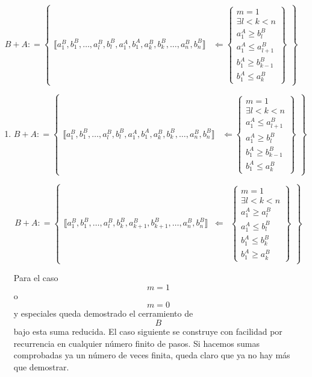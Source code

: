 \documentclass[
]{article}
\begin{document}
\[{{B + A}{: =}}\begin{Bmatrix}
{⟦{{a_{1}^{B},b_{1}^{B}},\ldots,{a_{l}^{B},b_{l}^{B}},{a_{1}^{A},b_{1}^{A}},{a_{k}^{B},b_{k}^{B}},\ldots,{a_{n}^{B},b_{n}^{B}}}⟧} & {\Leftarrow\begin{Bmatrix}
{m = 1} \\
{\exists{{l < k} < n}} \\
{a_{1}^{A} \geq b_{l}^{B}} \\
{a_{1}^{A} \leq a_{l + 1}^{B}} \\
{b_{1}^{A} \geq b_{k - 1}^{B}} \\
{b_{1}^{A} \leq a_{k}^{B}}
\end{Bmatrix}}
\end{Bmatrix}\]

\begin{enumerate}
\def\labelenumi{\arabic{enumi}.}
\setcounter{enumi}{4}
\item
  \[{{B + A}{: =}}\begin{Bmatrix}
  {⟦{{a_{1}^{B},b_{1}^{B}},\ldots,{a_{l}^{B},b_{l}^{B}},{a_{1}^{A},b_{1}^{A}},{a_{k}^{B},b_{k}^{B}},\ldots,{a_{n}^{B},b_{n}^{B}}}⟧} & {\Leftarrow\begin{Bmatrix}
  {m = 1} \\
  {\exists{{l < k} < n}} \\
  {a_{1}^{A} \leq a_{l + 1}^{B}} \\
  {a_{1}^{A} \geq b_{l}^{B}} \\
  {b_{1}^{A} \geq b_{k - 1}^{B}} \\
  {b_{1}^{A} \leq a_{k}^{B}}
  \end{Bmatrix}}
  \end{Bmatrix}\]

  \[{{B + A}{: =}}\begin{Bmatrix}
  {⟦{{a_{1}^{B},b_{1}^{B}},\ldots,{a_{l}^{B},b_{k}^{B}},{a_{k + 1}^{B},b_{k + 1}^{B}},\ldots,{a_{n}^{B},b_{n}^{B}}}⟧} & \Leftarrow & \begin{Bmatrix}
  {m = 1} \\
  {\exists{{l < k} < n}} \\
  {a_{1}^{A} \geq a_{l}^{B}} \\
  {a_{1}^{A} \leq b_{l}^{B}} \\
  {b_{1}^{A} \leq b_{k}^{B}} \\
  {b_{1}^{A} \geq a_{k}^{B}}
  \end{Bmatrix}
  \end{Bmatrix}\]

  Para el caso \[m = 1\] o \[m = 0\] y especiales queda demostrado el
  cerramiento de \[B\]bajo esta suma reducida. El caso siguiente se
  construye con facilidad por recurrencia en cualquier número finito de
  pasos. Si hacemos sumas comprobadas ya un número de veces finita,
  queda claro que ya no hay más que demostrar.


\end{enumerate}
\end{document}
